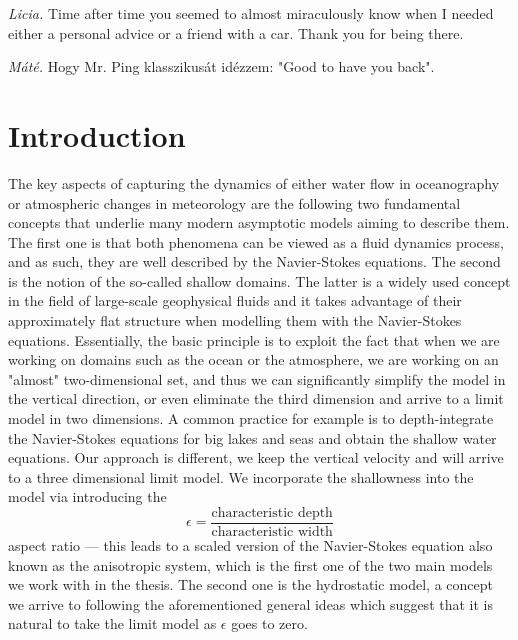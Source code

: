 \documentclass[12pt]{report}
\numberwithin{theorem}{chapter}
\numberwithin{corollary}{chapter}
\numberwithin{lemma}{chapter}
\numberwithin{remark}{chapter}
\numberwithin{definition}{chapter}
\numberwithin{prop}{chapter}
\newcommand\blankpage{%
    \null
    \thispagestyle{empty}%
    \addtocounter{page}{-1}%
    \newpage}
\begin{document}
\textit{Licia.} Time after time you seemed to almost miraculously know when I needed either a personal advice or a friend with a car. Thank you for being there.

\textit{M\'at\'e.} Hogy Mr. Ping klasszikus\'at id\'ezzem: "Good to have you back".

\newpage
\afterpage{\blankpage}

\tableofcontents
\newpage


\chapter*{Introduction} \label{Introduction}

The key aspects of capturing the dynamics of either water flow in oceanography or atmospheric changes in meteorology are the following two fundamental concepts that underlie many modern asymptotic models aiming to describe them. The first one is that both phenomena can be viewed as a fluid dynamics process, and as such, they are well described by the Navier-Stokes equations. The second is the notion of the so-called shallow domains. The latter is a widely used concept in the field of large-scale geophysical fluids and it takes advantage of their approximately flat structure when modelling them with the Navier-Stokes equations. Essentially, the basic principle is to exploit the fact that when we are working on domains such as the ocean or the atmosphere, we are working on an "almost" two-dimensional set, and thus we can significantly simplify the model in the vertical direction, or even eliminate the third dimension and arrive to a limit model in two dimensions.
A common practice for example is to depth-integrate the Navier-Stokes equations for big lakes and seas and obtain the shallow water equations.
Our approach is different, we keep the vertical velocity and will arrive to a three dimensional limit model.
We incorporate the shallowness into the model via introducing the
\[ \epsilon = \frac{\text{characteristic depth}}{\text{characteristic width}} \]
aspect ratio --- this leads to a scaled version of the Navier-Stokes equation also known as the anisotropic system, which is the first one of the two main models we work with in the thesis. The second one is the hydrostatic model, a concept we arrive to following the aforementioned general ideas which suggest that it is natural to take the limit model as $\epsilon$ goes to zero.
\end{document}

